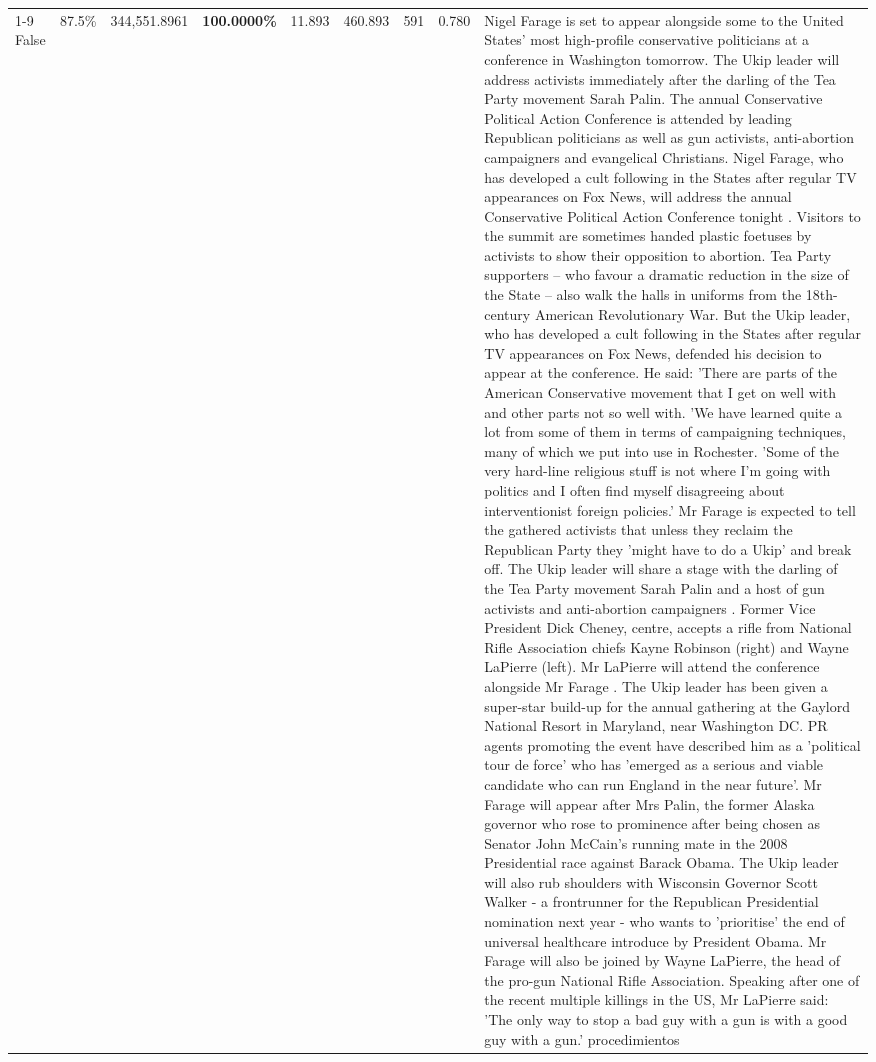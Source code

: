 \begin{table}[H]
\begin{tabular}{lllrlllll}
\cline{1-9}
False & 87.5\% & 344,551.8961 & \bfseries \color{red} 100.0000\% & 11.893 & 460.893 & 591 & 0.780 & Nigel Farage is set to appear alongside some to the United States' most high-profile conservative politicians at a conference in Washington tomorrow. The Ukip leader will address activists immediately after the darling of the Tea Party movement Sarah Palin. The annual Conservative Political Action Conference is attended by leading Republican politicians as well as gun activists, anti-abortion campaigners and evangelical Christians. Nigel Farage, who has developed a cult following in the States after regular TV appearances on Fox News, will address the annual Conservative Political Action Conference tonight . Visitors to the summit are sometimes handed plastic foetuses by activists to show their opposition to abortion. Tea Party supporters – who favour a dramatic reduction in the size of the State – also walk the halls in uniforms from the 18th-century American Revolutionary War. But the Ukip leader, who has developed a cult following in the States after regular TV appearances on Fox News, defended his decision to appear at the conference. He said: 'There are parts of the American Conservative movement that I get on well with and other parts not so well with. 'We have learned quite a lot from some of them in terms of campaigning techniques, many of which we put into use in Rochester. 'Some of the very hard-line religious stuff is not where I'm going with politics and I often find myself disagreeing about interventionist foreign policies.' Mr Farage is expected to tell the gathered activists that unless they reclaim the Republican Party they 'might have to do a Ukip' and break off. The Ukip leader will share a stage with the darling of the Tea Party movement Sarah Palin and a host of gun activists and anti-abortion campaigners . Former Vice President Dick Cheney, centre, accepts a rifle from National Rifle Association chiefs Kayne Robinson (right) and Wayne LaPierre (left). Mr LaPierre will attend the conference alongside Mr Farage . The Ukip leader has been given a super-star build-up for the annual gathering at the Gaylord National Resort in Maryland, near Washington DC. PR agents promoting the event have described him as a 'political tour de force' who has 'emerged as a serious and viable candidate who can run England in the near future'. Mr Farage will appear after Mrs Palin, the former Alaska governor who rose to prominence after being chosen as Senator John McCain's running mate in the 2008 Presidential race against Barack Obama. The Ukip leader will also rub shoulders with Wisconsin Governor Scott Walker - a frontrunner for the Republican Presidential nomination next year - who wants to 'prioritise' the end of universal healthcare introduce by President Obama. Mr Farage will also be joined by Wayne LaPierre, the head of the pro-gun National Rifle Association. Speaking after one of the recent multiple killings in the US, Mr LaPierre said: 'The only way to stop a bad guy with a gun is with a good guy with a gun.' procedimientos \\

\end{tabular}
\end{table}
